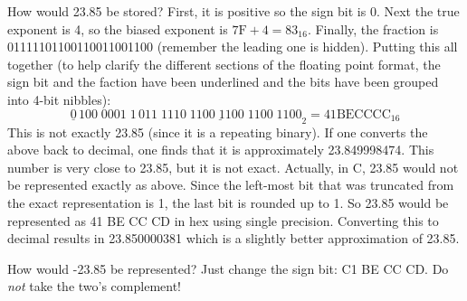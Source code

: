 How would 23.85 be stored?  First, it is positive so the sign bit is
0. Next the true exponent is 4, so the biased exponent is $7\mathrm{F}
+ 4 = 83_{16}$. Finally, the fraction is 01111101100110011001100
(remember the leading one is hidden). Putting this all together
(to help clarify the different sections of the floating point
format, the sign bit and the faction have been underlined and the
bits have been grouped into 4-bit nibbles):
\[ \underline{0}\,100\;0001\;1
   \,\underline{011\;1110\;1100\;1100\;1100\;1100}_2 = 41 \mathrm{BE} 
\mathrm{CC} \mathrm{CC}_{16} \]
This is not exactly 23.85 (since it is a repeating binary). If one converts
the above back to decimal, one finds that it is approximately 
23.849998474. This number is very close to 23.85, but it is not exact. 
Actually, in C, 23.85 would not be represented exactly as above. Since
the left-most bit that was truncated from the exact representation is 1,
the last bit is rounded up to 1. So 23.85 would be represented as
41 BE CC CD in hex using single precision. Converting this to decimal
results in 23.850000381 which is a slightly better approximation of 23.85.

How would -23.85 be represented? Just change the sign bit: C1 BE CC
CD. Do \emph{not} take the two's complement!

\begin{table}[t]
\caption{Special values of \emph{f} and \emph{e}\label{tab:floatSpecials}}
\end{table}

